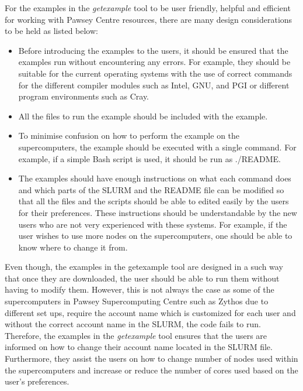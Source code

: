 For the examples in the \emph{getexample} tool to be user friendly, helpful and efficient for working with Pawsey Centre resources, there are many design 
considerations to be held as listed below:

\begin{itemize}
\item Before introducing the examples to the users, it should be ensured that the examples run without encountering any errors. For example,
they should be suitable for the current operating systems with the use of correct commands for the different compiler modules such as Intel, GNU,
and PGI or different program environments such as Cray.
\item All the files to run the example should be included with the example.
\item To minimise confusion on how to perform the example on the supercomputers, the example should be executed with a single command. For example, 
if a simple Bash script is used, it should be run as ./README.
\item The examples should have enough instructions on what each command does and which parts of the SLURM and the README file can be modified so that
all the files and the scripts should be able to edited easily by the users for their preferences. These instructions should be understandable by the new 
users who are not very experienced with these systems. For example, if the user wishes to use more nodes on the supercomputers, one should be able to 
know where to change it from.
\end{itemize}
 
Even though, the examples in the getexample tool are designed in a such way that once they are downloaded, the user should be able to run them without
having to modify them. However, this is not always the case as some of the supercomputers in Pawsey Supercomputing Centre such as Zythos due to
different set ups, require the account name which is customized for each user and without the correct account name in the SLURM, the code fails to run. 
Therefore, the examples in the \emph{getexample} tool ensures that the users are informed on how to change their account name located in the SLURM file.
Furthermore, they assist the users on how to change number of nodes used within the supercomputers and increase or reduce the number of cores used
based on the user's preferences.


